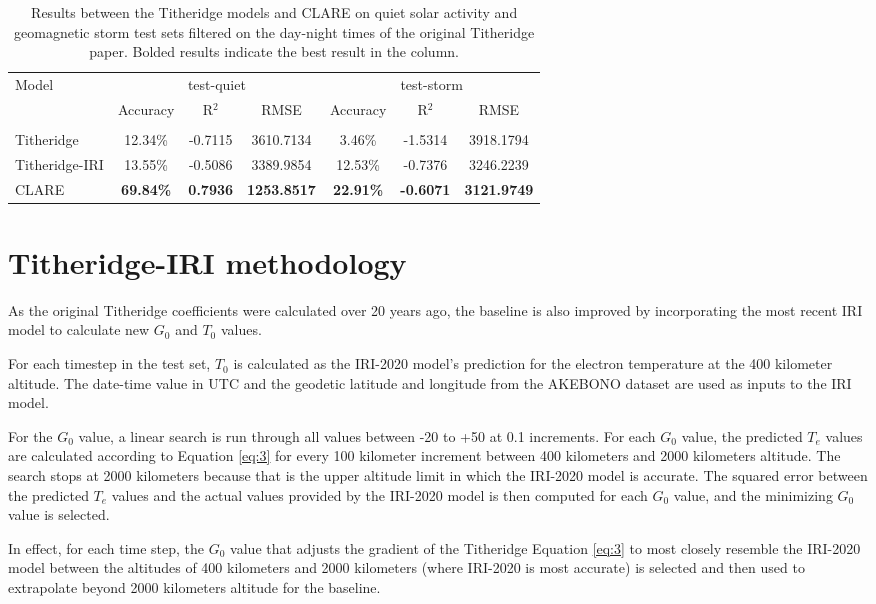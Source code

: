 \documentclass{agujournal2019}
\begin{document}
\begin{table}[htbp]
    \caption{Results between the Titheridge models and CLARE on quiet solar activity and geomagnetic storm test sets filtered on the day-night times of the original Titheridge paper. Bolded results indicate the best result in the column.}
    \centering
    \begin{tabular}{lcccccc}
        \toprule
        \multirow{2}{*}{Model} & \multicolumn{3}{c}{test-quiet} & \multicolumn{3}{c}{test-storm} \\
        \cmidrule(lr){2-4} \cmidrule(lr){5-7}
        & Accuracy & R$^2$ & RMSE & Accuracy & R$^2$ & RMSE \\
        \midrule
        \\[-0.8em]
        Titheridge & 12.34\% & -0.7115 & 3610.7134 & 3.46\% & -1.5314 &  3918.1794 \\[0.5em]
        Titheridge-IRI & 13.55\% & -0.5086 & 3389.9854 & 12.53\% & -0.7376 & 3246.2239 \\[0.5em]        
        CLARE & \textbf{69.84\%} & \textbf{0.7936} & \textbf{1253.8517} & \textbf{22.91\%} & \textbf{-0.6071} & \textbf{3121.9749} \\[0.5em]
        \bottomrule
    \end{tabular}
    \label{tab:model_comparison_diurnal}
\end{table}




\section{Titheridge-IRI methodology}
\label{titheridge-iri-calculation}

As the original Titheridge coefficients were calculated over 20 years ago, the baseline is also improved by incorporating the most recent IRI model to calculate new $G_0$ and $T_0$ values.

For each timestep in the test set, $T_0$ is calculated as the IRI-2020 model's prediction for the electron temperature at the 400 kilometer altitude. The date-time value in UTC and the geodetic latitude and longitude from the AKEBONO dataset are used as inputs to the IRI model.

For the $G_0$ value, a linear search is run through all values between -20 to +50 at 0.1 increments. For each $G_0$ value, the predicted $T_e$ values are calculated according to Equation \ref{eq:3} for every 100 kilometer increment between 400 kilometers and 2000 kilometers altitude. The search stops at 2000 kilometers because that is the upper altitude limit in which the IRI-2020 model is accurate. The squared error between the predicted $T_e$ values and the actual values provided by the IRI-2020 model is then computed for each $G_0$ value, and the minimizing $G_0$ value is selected.

In effect, for each time step, the $G_0$ value that adjusts the gradient of the Titheridge Equation \ref{eq:3} to most closely resemble the IRI-2020 model between the altitudes of 400 kilometers and 2000 kilometers (where IRI-2020 is most accurate) is selected and then used to extrapolate beyond 2000 kilometers altitude for the baseline.

\newpage

\end{document}
